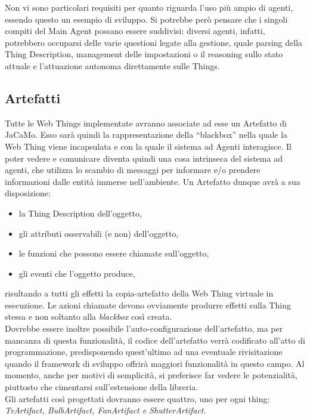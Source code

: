 \documentclass[12pt,a4paper,openright,oneside]{report}
\newcommand{\quotes}[1]{``#1''}
\begin{document}
Non vi sono particolari requisiti per quanto riguarda l'uso più ampio di agenti, essendo questo un esempio di sviluppo. Si potrebbe però pensare che i singoli compiti del Main Agent possano essere suddivisi: diversi agenti, infatti, potrebbero occuparsi delle varie questioni legate alla gestione, quale parsing della Thing Description, management delle impostazioni o il reasoning sullo stato attuale e l'attuazione autonoma direttamente sulle Things.

\subsection{Artefatti}
Tutte le Web Things implementate avranno associate ad esse un Artefatto di JaCaMo. Esso sarà quindi la rappresentazione della \quotes{blackbox} nella quale la Web Thing viene incapsulata e con la quale il sistema ad Agenti interagisce. Il poter vedere e comunicare diventa quindi una cosa intrinseca del sistema ad agenti, che utilizza lo scambio di messaggi per informare e/o prendere informazioni dalle entità immerse nell'ambiente. Un Artefatto dunque avrà a sua disposizione:

\begin{itemize}
	\item la Thing Description dell'oggetto,
	\item gli attributi osservabili (e non) dell'oggetto,
	\item le funzioni che possono essere chiamate sull'oggetto,
	\item gli eventi che l'oggetto produce,
\end{itemize}

risultando a tutti gli effetti la copia-artefatto della Web Thing virtuale in esecuzione. Le azioni chiamate devono ovviamente produrre effetti sulla Thing stessa e non soltanto alla \textit{blackbox} così creata.\\

Dovrebbe essere inoltre possibile l'auto-configurazione dell'artefatto, ma per mancanza di questa funzionalità, il codice dell'artefatto verrà codificato all'atto di programmazione, predisponendo quest'ultimo ad una eventuale rivisitazione quando il framework di sviluppo offrirà maggiori funzionalità in questo campo. Al momento, anche per motivi di semplicità, si preferisce far vedere le potenzialità, piuttosto che cimentarsi sull'estensione della libreria.\\

Gli artefatti così progettati dovranno essere quattro, uno per ogni thing: \textit{TvArtifact, BulbArtifact, FanArtifact e ShutterArtifact}.
\end{document}

